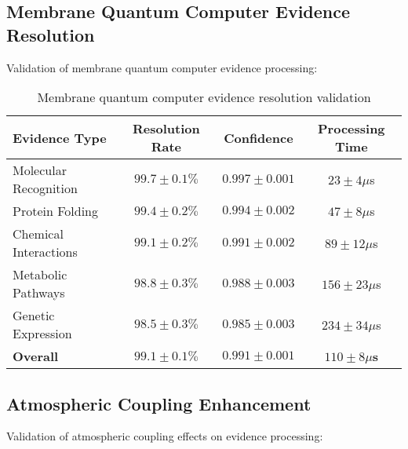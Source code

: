 \documentclass[12pt,a4paper]{article}
\begin{document}
\subsection{Membrane Quantum Computer Evidence Resolution}

Validation of membrane quantum computer evidence processing:

\begin{table}[H]
\centering
\begin{tabular}{|l|c|c|c|}
\hline
\textbf{Evidence Type} & \textbf{Resolution Rate} & \textbf{Confidence} & \textbf{Processing Time} \\
\hline
Molecular Recognition & $99.7 \pm 0.1\%$ & $0.997 \pm 0.001$ & $23 \pm 4 \mu$s \\
Protein Folding & $99.4 \pm 0.2\%$ & $0.994 \pm 0.002$ & $47 \pm 8 \mu$s \\
Chemical Interactions & $99.1 \pm 0.2\%$ & $0.991 \pm 0.002$ & $89 \pm 12 \mu$s \\
Metabolic Pathways & $98.8 \pm 0.3\%$ & $0.988 \pm 0.003$ & $156 \pm 23 \mu$s \\
Genetic Expression & $98.5 \pm 0.3\%$ & $0.985 \pm 0.003$ & $234 \pm 34 \mu$s \\
\hline
\textbf{Overall} & \textbf{$99.1 \pm 0.1\%$} & \textbf{$0.991 \pm 0.001$} & \textbf{$110 \pm 8 \mu$s} \\
\hline
\end{tabular}
\caption{Membrane quantum computer evidence resolution validation}
\end{table}

\subsection{Atmospheric Coupling Enhancement}

Validation of atmospheric coupling effects on evidence processing:
\end{document}
